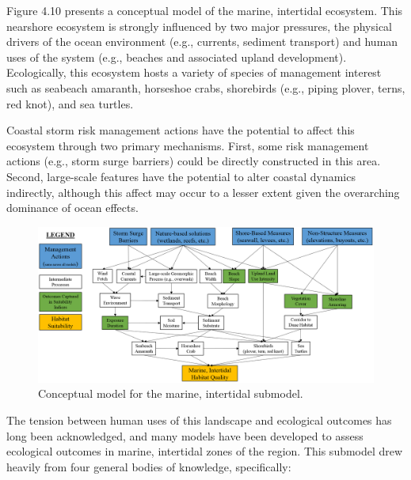 \documentclass[
]{book}
\begin{document}
Figure 4.10 presents a conceptual model of the marine, intertidal ecosystem. This nearshore ecosystem is strongly influenced by two major pressures, the physical drivers of the ocean environment (e.g., currents, sediment transport) and human uses of the system (e.g., beaches and associated upland development). Ecologically, this ecosystem hosts a variety of species of management interest such as seabeach amaranth, horseshoe crabs, shorebirds (e.g., piping plover, terns, red knot), and sea turtles.

Coastal storm risk management actions have the potential to affect this ecosystem through two primary mechanisms. First, some risk management actions (e.g., storm surge barriers) could be directly constructed in this area. Second, large-scale features have the potential to alter coastal dynamics indirectly, although this affect may occur to a lesser extent given the overarching dominance of ocean effects.

\begin{figure}
\includegraphics[width=24.93in]{ZZ_Fig04.10_Mar.Int_ConModel} \caption{Conceptual model for the marine, intertidal submodel.}\label{fig:unnamed-chunk-18}
\end{figure}

The tension between human uses of this landscape and ecological outcomes has long been acknowledged, and many models have been developed to assess ecological outcomes in marine, intertidal zones of the region. This submodel drew heavily from four general bodies of knowledge, specifically:
\end{document}
